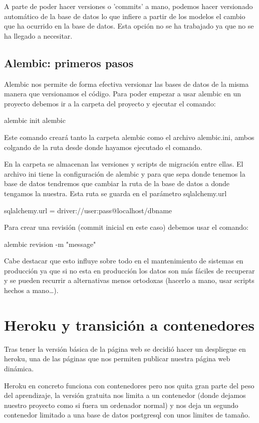 A parte de poder hacer versiones o 'commits' a mano, podemos hacer versionado automático de la base de datos lo que infiere a partir de los modelos el cambio que ha ocurrido en la base de datos. Esta opción no se ha trabajado ya que no se ha llegado a necesitar.

\subsection{Alembic: primeros pasos}

Alembic nos permite de forma efectiva versionar las bases de datos de la misma manera que versionamos el código. Para poder empezar a usar alembic en un proyecto debemos ir a la carpeta del proyecto y ejecutar el comando:

alembic init alembic

Este comando creará tanto la carpeta alembic como el archivo alembic.ini, ambos colgando de la ruta desde donde hayamos ejecutado el comando. 

En la carpeta se almacenan las versiones y scripts de migración entre ellas. El archivo ini tiene la configuración de alembic y para que sepa donde tenemos la base de datos tendremos que cambiar la ruta de la base de datos a donde tengamos la nuestra. Esta ruta se guarda en el parámetro sqlalchemy.url

sqlalchemy.url = driver://user:pass@localhost/dbname

Para crear una revisión (commit inicial en este caso) debemos usar el comando:

alembic revision -m "message"

Cabe destacar que esto influye sobre todo en el mantenimiento de sistemas en producción ya que si no esta en producción los datos son más fáciles de recuperar y se pueden recurrir a alternativas menos ortodoxas (hacerlo a mano, usar scripts hechos a mano\ldots).



\section{Heroku y transición a contenedores}

Tras tener la versión básica de la página web se decidió hacer un despliegue en heroku, una de las páginas que nos permiten publicar nuestra página web dinámica. 

Heroku en concreto funciona con contenedores pero nos quita gran parte del peso del aprendizaje, la versión gratuita nos limita a un contenedor (donde dejamos nuestro proyecto como si fuera un ordenador normal) y nos deja un segundo contenedor limitado a una base de datos postgresql con unos limites de tamaño. 

